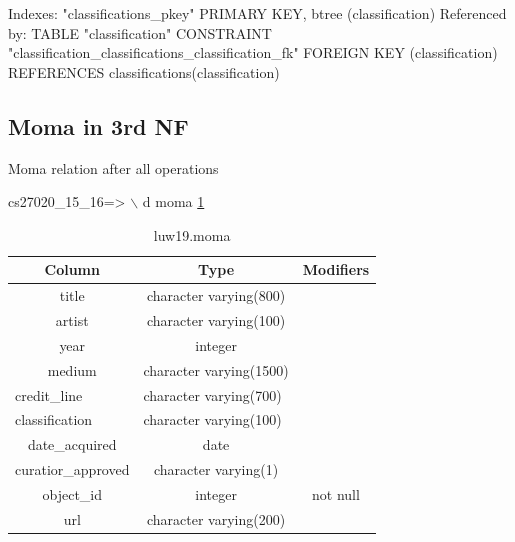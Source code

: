 \documentclass[journal,transmag]{IEEEtran}
\begin{document}
Indexes:
    "classifications\_pkey" PRIMARY KEY, btree (classification)
Referenced by:
    TABLE "classification" CONSTRAINT "classification\_classifications\_classification\_fk" FOREIGN KEY (classification) REFERENCES classifications(classification)
\newline


\subsection {Moma in 3rd NF}

Moma relation after all operations

cs27020\_15\_16=> $\backslash$ d moma \ref{moma2}
\newline


\begin{table}[]
\centering
\caption{luw19.moma}
\label{moma2}
\begin{tabular}{c|c|c}
Column                              & Type                                        & Modifiers            \\ \hline
title                               & character varying(800)                      &                      \\
artist                              & character varying(100)                      &                      \\
year                                & integer                                     &                      \\
medium                              & character varying(1500)                     &                      \\
\multicolumn{1}{l|}{credit\_line}   & \multicolumn{1}{l|}{character varying(700)} & \multicolumn{1}{l}{} \\
\multicolumn{1}{l|}{classification} & \multicolumn{1}{l|}{character varying(100)} & \multicolumn{1}{l}{} \\
date\_acquired                      & date                                        &                      \\
curatior\_approved                  & character varying(1)                        &                      \\
object\_id                          & integer                                     & not null             \\
url                                 & character varying(200)                      &                     
\end{tabular}
\end{table}
\end{document}
